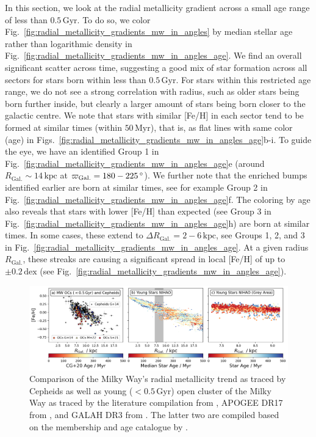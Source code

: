 \documentclass[fleqn,usenatbib]{mnras}
\newcommand{\nihaoAGEmax}{$0.5\,\mathrm{Gyr}$}
\begin{document}
In this section, we look at the radial metallicity gradient across a small age range of less than \nihaoAGEmax. To do so, we color Fig.~\ref{fig:radial_metallicity_gradients_mw_in_angles} by median stellar age rather than logarithmic density in Fig.~\ref{fig:radial_metallicity_gradients_mw_in_angles_age}. We find an overall significant scatter across time, suggesting a good mix of star formation across all sectors for stars born within less than \nihaoAGEmax. For stars within this restricted age range, we do not see a strong correlation with radius, such as older stars being born further inside, but clearly a larger amount of stars being born closer to the galactic centre. We note that stars with similar [Fe/H] in each sector tend to be formed at similar times (within $50\,\mathrm{Myr}$), that is, as flat lines with same color (age) in Figs.~\ref{fig:radial_metallicity_gradients_mw_in_angles_age}b-i. To guide the eye, we have an identified Group 1 in Fig.~\ref{fig:radial_metallicity_gradients_mw_in_angles_age}e (around $R_\mathrm{Gal.} \sim 14\,\mathrm{kpc}$ at $\varpi_\mathrm{Gal.} = 180-225\,\mathrm{\degree}$). We further note that the enriched bumps identified earlier are born at similar times, see for example Group 2 in Fig.~\ref{fig:radial_metallicity_gradients_mw_in_angles_age}f. The coloring by age also reveals that stars with lower [Fe/H] than expected (see Group 3 in Fig.~\ref{fig:radial_metallicity_gradients_mw_in_angles_age}h) are born at similar times. In some cases, these extend to $\Delta R_\mathrm{Gal.} = 2-6\,\mathrm{kpc}$, see Groups 1, 2, and 3 in Fig.~\ref{fig:radial_metallicity_gradients_mw_in_angles_age}. At a given radius $R_\mathrm{Gal.}$, these streaks are causing a significant spread in local [Fe/H] of up to $\pm 0.2\,\mathrm{dex}$ (see Fig.~\ref{fig:radial_metallicity_gradients_mw_in_angles_age}).

\begin{figure}
    \centering
    \includegraphics[width=\textwidth]{figures/radial_metallicity_gradients_mw_vs_nihao.png}
    \caption{Comparison of the Milky Way's radial metallicity trend as traced by Cepheids \citep[black triangles, compiled from literature by][G+14]{Genovali2014} as well as young ($<$\nihaoAGEmax) open cluster of the Milky Way as traced by the literature compilation from \citet[][G+14 as squares]{Genovali2014}, APOGEE DR17 from \citet[][M+22 as crosses]{Myers2022}, and GALAH DR3 from \citet[][S+21 as circles]{Spina2021}. The latter two are compiled based on the membership and age catalogue by \citet[][CG+20]{CantatGaudin2020}.
    }
    \label{fig:radial_metallicity_gradients_mw_vs_nihao}
\end{figure}
\end{document}
